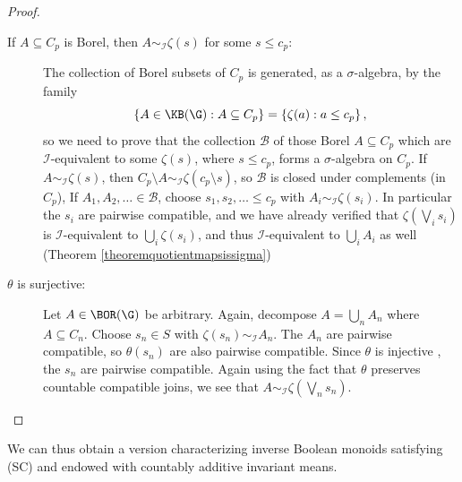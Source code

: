\begin{proof}
\begin{description}
\item[If $A\subseteq C_p$ is Borel, then $A\sim_{\mathcal{I}}\zeta(s)$ for some $s\leq c_p$:]

The collection of Borel subsets of $C_p$ is generated, as a $\sigma$-algebra, by the family
\[\left\{A\in\KB(\G):A\subseteq C_p\right\}=\left\{\zeta(a):a\leq c_p\right\},\]
so we need to prove that the collection $\mathcal{B}$ of those Borel $A\subseteq C_p$ which are $\mathcal{I}$-equivalent to some $\zeta(s)$, where $s\leq c_p$, forms a $\sigma$-algebra on $C_p$. If $A\sim_{\mathcal{I}}\zeta(s)$, then $C_p\setminus A\sim_{\mathcal{I}}\zeta(c_p\setminus s)$, so $\mathcal{B}$ is closed under complements (in $C_p$), If $A_1,A_2,\ldots\in\mathcal{B}$, choose $s_1,s_2,\ldots\leq c_p$ with $A_i\sim_{\mathcal{I}}\zeta(s_i)$. In particular the $s_i$ are pairwise compatible, and we have already verified that $\zeta(\bigvee_i s_i)$ is $\mathcal{I}$-equivalent to $\bigcup_i\zeta(s_i)$, and thus $\mathcal{I}$-equivalent to $\bigcup_i A_i$ as well (Theorem \ref{theoremquotientmapsissigma})


\item[$\theta$ is surjective:] Let $A\in\BOR(\G)$ be arbitrary. Again, decompose $A=\bigcup_n A_n$ where $A\subseteq C_n$. Choose $s_n\in S$ with $\zeta(s_n)\sim_{\mathcal{I}} A_n$. The $A_n$ are pairwise compatible, so $\theta(s_n)$ are also pairwise compatible. Since $\theta$ is injective%
, the $s_n$ are pairwise compatible. Again using the fact that $\theta$ preserves countable compatible joins, we see that $A\sim_{\mathcal{I}}\zeta(\bigvee_n s_n)$.\qedhere
\end{description}
\end{proof}

We can thus obtain a version characterizing inverse Boolean monoids satisfying (SC) and endowed with countably additive invariant means.

